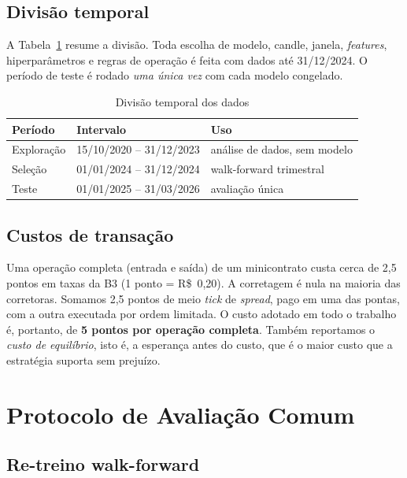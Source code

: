 \documentclass[conference]{IEEEtran}
\begin{document}
\subsection{Divisão temporal}

A Tabela~\ref{tab:divisao} resume a divisão. Toda escolha de modelo, candle, janela, \emph{features}, hiperparâmetros e regras de operação é feita com dados até 31/12/2024. O período de teste é rodado \emph{uma única vez} com cada modelo congelado.

\begin{table}[!t]
\centering
\caption{Divisão temporal dos dados}
\label{tab:divisao}
\footnotesize
\begin{tabular}{@{}lll@{}}
\toprule
Período & Intervalo & Uso \\
\midrule
Exploração & 15/10/2020 -- 31/12/2023 & análise de dados, sem modelo \\
Seleção    & 01/01/2024 -- 31/12/2024 & walk-forward trimestral \\
Teste      & 01/01/2025 -- 31/03/2026 & avaliação única \\
\bottomrule
\end{tabular}
\end{table}

\subsection{Custos de transação}

Uma operação completa (entrada e saída) de um minicontrato custa cerca de 2,5 pontos em taxas da B3 (1 ponto = R\$~0,20). A corretagem é nula na maioria das corretoras. Somamos 2,5 pontos de meio \emph{tick} de \emph{spread}, pago em uma das pontas, com a outra executada por ordem limitada. O custo adotado em todo o trabalho é, portanto, de \textbf{5 pontos por operação completa}. Também reportamos o \emph{custo de equilíbrio}, isto é, a esperança antes do custo, que é o maior custo que a estratégia suporta sem prejuízo.

\section{Protocolo de Avaliação Comum}

\subsection{Re-treino walk-forward}
\end{document}

